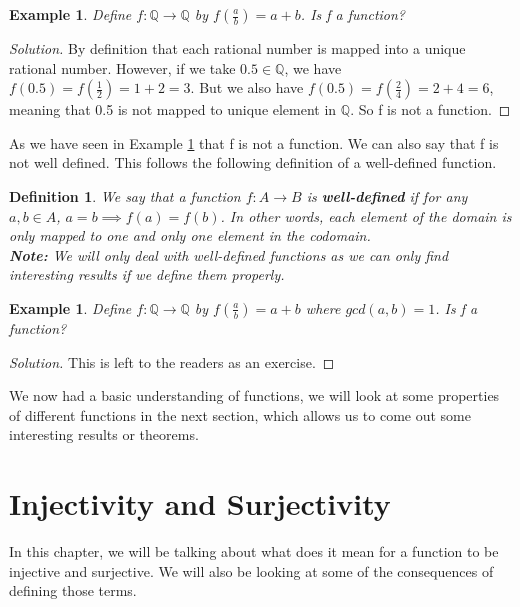 \documentclass{book}
\newtheorem{definition}[theorem]{Definition}
\newtheorem{example}[theorem]{Example}
\begin{document}
\begin{example} \label{Example 1.1.5}
    Define $f : \mathbb{Q} \rightarrow \mathbb{Q}$ by $f \left( \frac{a}{b} \right) = a + b$. Is f a function?
\end{example}

\begin{proof}[Solution]
    By definition that each rational number is mapped into a unique rational number. However, if we take $0.5 \in \mathbb{Q}$, we have $f(0.5) = f(\frac{1}{2}) = 1 + 2 = 3.$ But we also have $f(0.5) = f(\frac{2}{4}) = 2 + 4 = 6$, meaning that 0.5 is not mapped to unique element in $\mathbb{Q}$. So f is not a function.
\end{proof}

As we have seen in Example \ref{Example 1.1.5} that f is not a function. We can also say that f is not well defined. This follows the following definition of a well-defined function.

\begin{definition}
    We say that a function $f : A \rightarrow B$ is \textbf{well-defined} if for any $a, b \in A$, $a = b \implies f(a) = f(b)$. In other words, each element of the domain is only mapped to one and only one element in the codomain. \\
    \textbf{Note:} We will only deal with well-defined functions as we can only find interesting results if we define them properly.
\end{definition}

\begin{example}
     Define $f : \mathbb{Q} \rightarrow \mathbb{Q}$ by $f \left( \frac{a}{b} \right) = a + b$ where $gcd(a, b) = 1$. Is f a function?
\end{example}

\begin{proof}[Solution]
    This is left to the readers as an exercise.
\end{proof}

We now had a basic understanding of functions, we will look at some properties of different functions in the next section, which allows us to come out some interesting results or theorems.

\section{Injectivity and Surjectivity}
In this chapter, we will be talking about what does it mean for a function to be injective and surjective. We will also be looking at some of the consequences of defining those terms.
\end{document}
